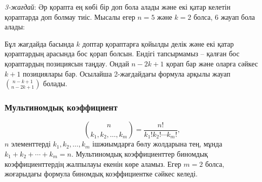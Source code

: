 \textit{3-жағдай}: Әр қорапта ең көбі бір доп бола алады
және екі қатар келетін қораптарда доп болмау тиіс. Мысалы
егер $n=5$ және $k=2$ болса, 6 жауап бола алады:



\begin{center}
\end{center}

Бұл жағдайда басында $k$ доптар қораптарға 
қойылды делік және екі қатар қораптардың арасында
бос қорап болсын. Ендігі тапсырмамыз --
қалған бос қораптардың позициясын таңдау. 
Ондай $n-2k+1$ қорап бар және оларға сәйкес $k+1$
позициялары бар. Осылайша 2-жағдайдағы формула
арқылы жауап ${n-k+1 \choose n-2k+1}$ болады.


\subsubsection{Мультиномдық коэффициент}


\[ {n \choose k_1,k_2,\ldots,k_m} = \frac{n!}{k_1! k_2! \cdots k_m!}, \]
$n$ элементтерді $k_1,k_2,\ldots,k_m$ ішжиымдарға бөлу жолдарына тең,
мұнда $k_1+k_2+\cdots+k_m=n$. Мультиномдық коэффициенттер
биномдық коэффициенттердің жалпылауы екенін көре аламыз. 
Егер $m=2$ болса, жоғарыдағы формула биномдық коэффициентке сәйкес келеді.

